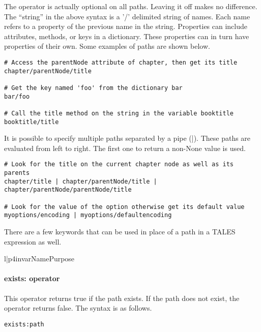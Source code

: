 The  operator is actually optional on all paths.  Leaving it
off makes no difference.  The ``string'' in the above syntax is a '/'
delimited string of names.  Each name refers to a property of the 
previous name in the string.  Properties can include attributes, methods,
or keys in a dictionary.  These properties can in turn have properties
of their own.  Some examples of paths are shown below.
\begin{verbatim}
# Access the parentNode attribute of chapter, then get its title
chapter/parentNode/title

# Get the key named 'foo' from the dictionary bar
bar/foo

# Call the title method on the string in the variable booktitle
booktitle/title
\end{verbatim}

It is possible to specify multiple paths separated by a pipe (|).
These paths are evaluated from left to right.  The first one to return
a non-None value is used.
\begin{verbatim}
# Look for the title on the current chapter node as well as its parents
chapter/title | chapter/parentNode/title | chapter/parentNode/parentNode/title

# Look for the value of the option otherwise get its default value
myoptions/encoding | myoptions/defaultencoding
\end{verbatim}

There are a few keywords that can be used in place of a path in a
TALES expression as well.
\begin{tableii}{l|p{4in}}{var}{Name}{Purpose}
\end{tableii}


\paragraph{exists: operator}

This operator returns true if the path exists.  If the path does not exist,
the operator returns false.   The syntax is as follows.
\begin{verbatim}
exists:path
\end{verbatim}

